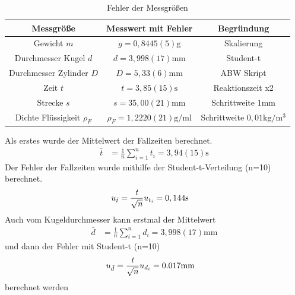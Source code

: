 \documentclass[11pt, a4paper]{article}
\begin{document}
    \begin{table}
       \begin{adjustwidth}{-5cm}{-5cm}
            \centering
            \begin{tabular}{c c c}
                Messgröße & Messwert mit Fehler & Begründung \\ \hline
                
                Gewicht $m$ & $g = 0,8445(5) \si{\gram}$ & Skalierung \\
                Durchmesser Kugel $d$ & $d = 3,998(17) \si{\milli\meter}$ & Student-t \\
                Durchmesser Zylinder $D$ & $D = 5,33(6) \si{\milli\meter}$ & ABW Skript \cite[Tabelle 6]{ABW} \\
                Zeit $t$ & $t = 3,85(15) \si{\second}$ & Reaktionszeit x2\\
                Strecke $s$ & $s = 35,00(21) \si{\milli\metre}$ & Schrittweite $1 \si{\milli\metre}$ \\
                Dichte Flüssigkeit $\rho_F$ & $\rho_F = 1,2220(21)  \si{\gram\per\milli\litre}$ & Schrittweite $0,01 \si{\kilogram\per\cubic\metre}$ \\

            \end{tabular}
        \end{adjustwidth}
        \label{tab:errors}
        \caption[]{Fehler der Messgrößen}
    \end{table}
    
    Als erstes wurde der Mittelwert der Fallzeiten berechnet.
    \begin{align}
        \bar{t} &= \frac{1}{n} \sum_{i=1}^{n} t_i = 3,94(15) \si{\second}
    \end{align}
    Der Fehler der Fallzeiten wurde mithilfe der Student-t-Verteilung (n=10) berechnet.
    \begin{align}
        u_{\bar{t}} &= \frac{{\it t}}{\sqrt{n}} u_{t_i} =  0,144 \si{\second}
    \end{align}
    Auch vom Kugeldurchmesser kann erstmal der Mittelwert
    \begin{align}
        \bar{d} &= \frac{1}{n} \sum_{i=1}^{n} d_i = 3,998(17) \si{\milli\metre}
    \end{align}
    und dann der Fehler mit Student-t (n=10)
    \begin{align}
        u_{\bar{d}} &= \frac{{\it t}}{\sqrt{n}} u_{d_i} = 0.017 \si{\milli\metre}
    \end{align}
    berechnet werden
\end{document}
